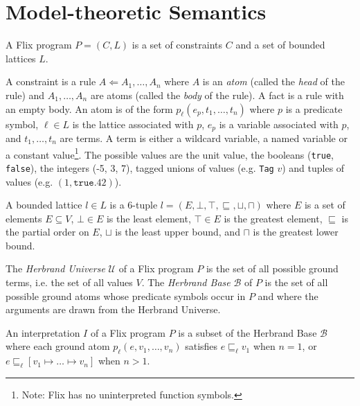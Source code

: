 \documentclass[10pt,twocolumn]{article}
\begin{document}
\section{Model-theoretic Semantics}

A Flix program $P = (C, L)$ is a set of constraints $C$ and a set of bounded lattices $L$.

A constraint is a rule $A \Leftarrow A_1, \dots, A_n$ 
where $A$ is an \emph{atom} (called the \emph{head} of the rule) 
and $A_1, \dots, A_n$ are atoms (called the \emph{body} of the rule).
A fact is a rule with an empty body.
An atom is of the form $p_\ell(e_p, t_1, \dots, t_n)$ where 
$p$ is a predicate symbol,
$\ell \in L$ is the lattice associated with $p$,
$e_p$ is a variable associated with $p$, and 
$t_1, \dots, t_n$ are terms. 
A term is either a wildcard variable, a named variable or a constant value\footnote{Note: Flix has no uninterpreted function symbols.}. 
The possible values are the unit value, the booleans (\texttt{true}, \texttt{false}),
the integers (-5, 3, 7), tagged unions of values (e.g. \texttt{Tag} $v$) and 
tuples of values (e.g. $(1, \texttt{true}. 42)$).

A bounded lattice $l \in L$ is a 6-tuple $l = (E, \bot, \top, \sqsubseteq, \sqcup, \sqcap)$ where 
$E$ is a set of elements $E \subseteq V$,
$\bot \in E$ is the least element,
$\top \in E$ is the greatest element,
$\sqsubseteq$ is the partial order on $E$,
$\sqcup$ is the least upper bound, and
$\sqcap$ is the greatest lower bound.

The \emph{Herbrand Universe} $\mathcal{U}$ of a Flix program $P$ is the set of 
all possible ground terms, i.e. the set of all values $V$.
The \emph{Herbrand Base} $\mathcal{B}$ of $P$ is the set of all possible ground atoms whose
predicate symbols occur in $P$ and where the arguments are drawn from the Herbrand Universe.


An interpretation $I$ of a Flix program $P$ is a subset of the Herbrand Base $\mathcal{B}$ where 
each ground atom $p_\ell(e, v_1, \dots, v_n)$ satisfies 
$e \sqsubseteq_\ell v_1$ when $n = 1$, or 
$e \sqsubseteq_\ell [v_1 \mapsto \dots \mapsto v_n]$ when $n > 1$.
\end{document}
